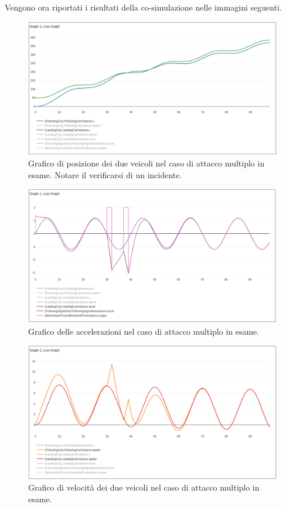 Vengono ora riportati i risultati della co-simulazione nelle immagini seguenti.
\begin{figure}[H]
	\centering
	\includegraphics[width=\textwidth]{img/MultiAttackAccelPlotXCrash.png}
	\caption{Grafico di posizione dei due veicoli nel caso di attacco multiplo in esame. Notare il verificarsi di un incidente.}
\end{figure}

\begin{figure}[H]
	\centering
	\includegraphics[width=\textwidth]{img/MultiAttackAccelPlotAccelCrash.png}
	\caption{Grafico delle accelerazioni nel caso di attacco multiplo in esame.}
\end{figure}
\begin{figure}[H]
	\centering
	\includegraphics[width=\textwidth]{img/MultiAttackAccelPlotSpeedCrash.png}
	\caption{Grafico di velocità dei due veicoli nel caso di attacco multiplo in esame.}
\end{figure}

